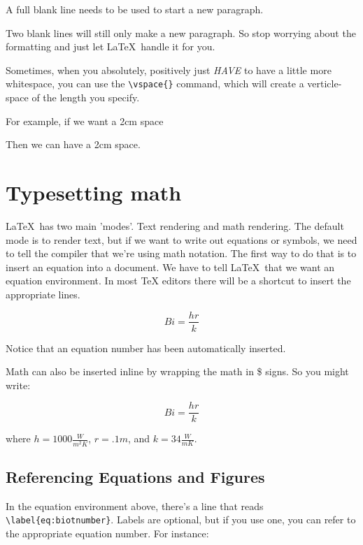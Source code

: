 \documentclass[12pt,a4paper]{article}
\begin{document}
  A full blank line needs to be used to start a new paragraph.  


  Two blank lines will still only make a new paragraph. So stop worrying
  about the formatting and just let \LaTeX\ handle it for you.  

  Sometimes, when you absolutely, positively just \textit{HAVE} to have
  a little more whitespace, you can use the \verb|\vspace{}| command,
  which will create a verticle-space of the length you specify.  

  For example, if we want a 2cm space

  \vspace{2cm}
 
  Then we can have a 2cm space.

\section{Typesetting math}
  \LaTeX\ has two main 'modes'.  Text
  rendering and math rendering.  The default mode is to render text, but
  if we want to write out equations or symbols, we need to tell the
  compiler that we're using math notation.  The first way to do that is
  to insert an equation into a document.
  We have to tell \LaTeX\ that we want an equation environment.  In most
  TeX editors there will be a shortcut to insert the appropriate
  lines.  

  \begin{equation}
    Bi = \frac{hr}{k}
    \label{eq:biotnumber}
  \end{equation}

  Notice that an equation number has been automatically inserted. 

  Math can also be inserted inline by wrapping the math in \$ signs. So
  you might write: 

  \begin{equation}
    Bi = \frac{hr}{k}
    \label{eq:biotnumber2}
  \end{equation}

  where $h = 1000 \frac{W}{m^2K}$, $r = .1m$, and $k = 34 \frac{W}{m
  K}$.
  
  \subsection{Referencing Equations and Figures}
  In the equation environment above, there's a line that reads
  \verb|\label{eq:biotnumber}|.  Labels are optional, but if you use
  one, you can refer to the appropriate equation number.  For instance:
  
\end{document}
